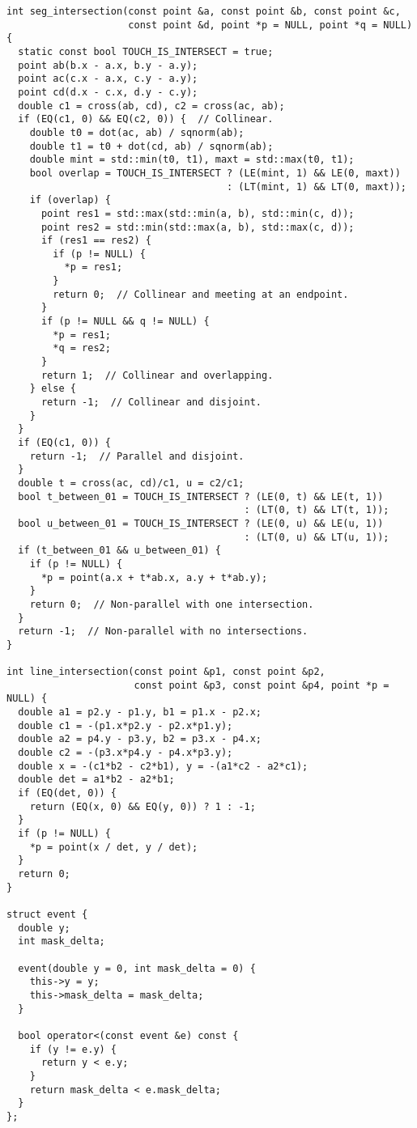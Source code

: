 \begin{lstlisting}
int seg_intersection(const point &a, const point &b, const point &c,
                     const point &d, point *p = NULL, point *q = NULL) {
  static const bool TOUCH_IS_INTERSECT = true;
  point ab(b.x - a.x, b.y - a.y);
  point ac(c.x - a.x, c.y - a.y);
  point cd(d.x - c.x, d.y - c.y);
  double c1 = cross(ab, cd), c2 = cross(ac, ab);
  if (EQ(c1, 0) && EQ(c2, 0)) {  // Collinear.
    double t0 = dot(ac, ab) / sqnorm(ab);
    double t1 = t0 + dot(cd, ab) / sqnorm(ab);
    double mint = std::min(t0, t1), maxt = std::max(t0, t1);
    bool overlap = TOUCH_IS_INTERSECT ? (LE(mint, 1) && LE(0, maxt))
                                      : (LT(mint, 1) && LT(0, maxt));
    if (overlap) {
      point res1 = std::max(std::min(a, b), std::min(c, d));
      point res2 = std::min(std::max(a, b), std::max(c, d));
      if (res1 == res2) {
        if (p != NULL) {
          *p = res1;
        }
        return 0;  // Collinear and meeting at an endpoint.
      }
      if (p != NULL && q != NULL) {
        *p = res1;
        *q = res2;
      }
      return 1;  // Collinear and overlapping.
    } else {
      return -1;  // Collinear and disjoint.
    }
  }
  if (EQ(c1, 0)) {
    return -1;  // Parallel and disjoint.
  }
  double t = cross(ac, cd)/c1, u = c2/c1;
  bool t_between_01 = TOUCH_IS_INTERSECT ? (LE(0, t) && LE(t, 1))
                                         : (LT(0, t) && LT(t, 1));
  bool u_between_01 = TOUCH_IS_INTERSECT ? (LE(0, u) && LE(u, 1))
                                         : (LT(0, u) && LT(u, 1));
  if (t_between_01 && u_between_01) {
    if (p != NULL) {
      *p = point(a.x + t*ab.x, a.y + t*ab.y);
    }
    return 0;  // Non-parallel with one intersection.
  }
  return -1;  // Non-parallel with no intersections.
}

int line_intersection(const point &p1, const point &p2,
                      const point &p3, const point &p4, point *p = NULL) {
  double a1 = p2.y - p1.y, b1 = p1.x - p2.x;
  double c1 = -(p1.x*p2.y - p2.x*p1.y);
  double a2 = p4.y - p3.y, b2 = p3.x - p4.x;
  double c2 = -(p3.x*p4.y - p4.x*p3.y);
  double x = -(c1*b2 - c2*b1), y = -(a1*c2 - a2*c1);
  double det = a1*b2 - a2*b1;
  if (EQ(det, 0)) {
    return (EQ(x, 0) && EQ(y, 0)) ? 1 : -1;
  }
  if (p != NULL) {
    *p = point(x / det, y / det);
  }
  return 0;
}

struct event {
  double y;
  int mask_delta;

  event(double y = 0, int mask_delta = 0) {
    this->y = y;
    this->mask_delta = mask_delta;
  }

  bool operator<(const event &e) const {
    if (y != e.y) {
      return y < e.y;
    }
    return mask_delta < e.mask_delta;
  }
};


\end{lstlisting}
